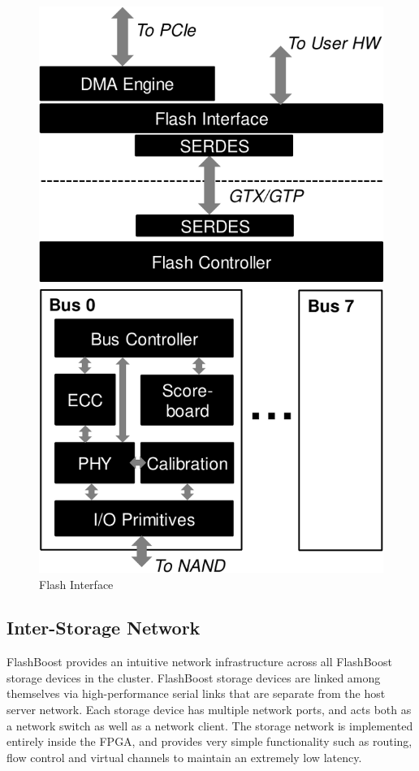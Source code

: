 \begin{figure}[h]
	\begin{center}
	\includegraphics[scale=0.4]{figures/top-arch-crop.pdf}
	\caption{Flash Interface}
	\label{fig:flashinterface}
	\end{center}
\end{figure}

\subsection{Inter-Storage Network}

FlashBoost provides an intuitive network infrastructure across all FlashBoost
storage devices in the cluster.
FlashBoost storage devices are linked among themselves via
high-performance serial links that are separate from the host server network. 
Each storage device has multiple network ports, and acts both as a network switch as
well as a network client. The storage network is implemented entirely inside the
FPGA, and provides very simple functionality such as routing, flow control and
virtual channels to maintain an extremely low latency.

